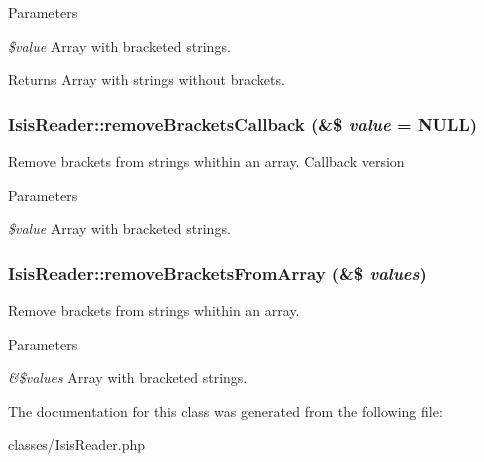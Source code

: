 \begin{DoxyParams}{Parameters}
\item[{\em \$value}]Array with bracketed strings.\end{DoxyParams}
\begin{DoxyReturn}{Returns}
Array with strings without brackets. 
\end{DoxyReturn}
\hypertarget{classIsisReader_acba8842f0033356fff66c0f88391921e}{
\subsubsection[{removeBracketsCallback}]{\setlength{\rightskip}{0pt plus 5cm}IsisReader::removeBracketsCallback (\&\$ {\em value} = {\ttfamily NULL})}}
\label{classIsisReader_acba8842f0033356fff66c0f88391921e}
Remove brackets from strings whithin an array. Callback version


\begin{DoxyParams}{Parameters}
\item[{\em \$value}]Array with bracketed strings. \end{DoxyParams}
\hypertarget{classIsisReader_a60ece3bbe11a2b4ac6afa6e65f282724}{
\subsubsection[{removeBracketsFromArray}]{\setlength{\rightskip}{0pt plus 5cm}IsisReader::removeBracketsFromArray (\&\$ {\em values})}}
\label{classIsisReader_a60ece3bbe11a2b4ac6afa6e65f282724}
Remove brackets from strings whithin an array.


\begin{DoxyParams}{Parameters}
\item[{\em \&\$values}]Array with bracketed strings. \end{DoxyParams}


The documentation for this class was generated from the following file:\begin{DoxyCompactItemize}
\item 
classes/IsisReader.php\end{DoxyCompactItemize}
